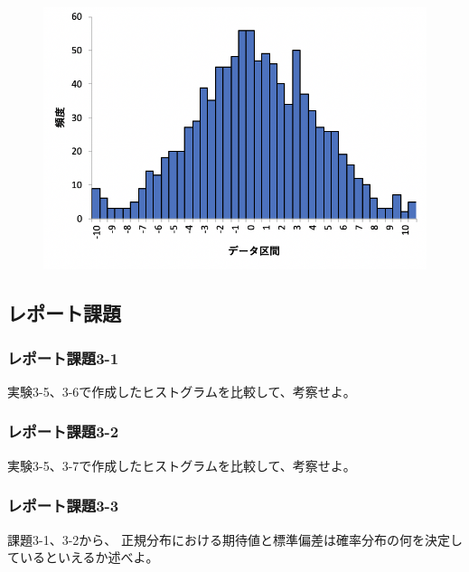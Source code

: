 \documentclass[12pt]{jarticle}
\begin{document}
\begin{figure}[h]
    \begin{center}
        \includegraphics[scale=0.7]{kadai4_3graph5.png}
    \end{center}
    \caption{}
\end{figure}

\subsection{レポート課題}
\subsubsection*{レポート課題3-1}
\begin{shadebox}
    実験3-5、3-6で作成したヒストグラムを比較して、考察せよ。
\end{shadebox}

\subsubsection*{レポート課題3-2}
\begin{shadebox}
    実験3-5、3-7で作成したヒストグラムを比較して、考察せよ。
\end{shadebox}

\subsubsection*{レポート課題3-3}
\begin{shadebox}
    課題3-1、3-2から、
    正規分布における期待値と標準偏差は確率分布の何を決定しているといえるか述べよ。
\end{shadebox}
\end{document}
